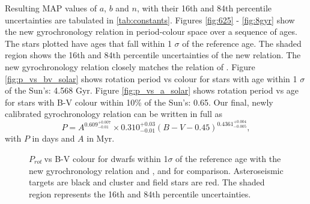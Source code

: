 \documentclass[10pt,preprint]{aastex}
\newcommand{\prot}{$P_{rot}~$}
\newcommand{\gyroa}{0.310}
\newcommand{\aerrp}{0.03}
\newcommand{\aerrm}{0.01}
\newcommand{\gyron}{0.609}
\newcommand{\nerrp}{0.007}
\newcommand{\nerrm}{0.01}
\newcommand{\gyrob}{0.4361}
\newcommand{\berrp}{0.004}
\newcommand{\berrm}{0.005}
\begin{document}
Resulting MAP values of $a$, $b$ and $n$, with their 16th and 84th percentile uncertainties are tabulated in \ref{tab:constants}.
Figures \ref{fig:625} - \ref{fig:8gyr} show the new gyrochronology relation in period-colour space over a sequence of ages.
The stars plotted have ages that fall within 1 $\sigma$ of the reference age.
The shaded region shows the 16th and 84th percentile uncertainties of the new relation.
The new gyrochronology relation closely matches the relation of \citet{Mamajek2008}.
Figure \ref{fig:p_vs_bv_solar} shows rotation period vs colour for stars with age within 1 $\sigma$ of the Sun's: 4.568 Gyr.
Figure \ref{fig:p_vs_a_solar} shows rotation period vs age for stars with B-V colour within 10\% of the Sun's: 0.65.
Our final, newly calibrated gyrochronology relation can be written in full as
\begin{equation}
	P = A^{\gyron^{+\nerrp}_{-\nerrm}} \times \gyroa^{+\aerrp}_{-\aerrm}(B-V-0.45)^{\gyrob^{+\berrp}_{-\berrm}},
\label{eq:Barnes2007_2}
\end{equation}
with $P$ in days and $A$ in Myr.

\begin{figure}[ht]
\begin{center}
    \end{center}
    \caption{ \prot vs B-V colour for dwarfs within 1$\sigma$ of the reference age with the new gyrochronology relation and \citet{Barnes2007}, and \citet{Mamajek2008} for comparison. Asteroseismic targets are black and cluster and field stars are red. The shaded region represents the 16th and 84th percentile uncertainties.
     }
   \label{fig:subfigures2}
\end{figure}
\end{document}
